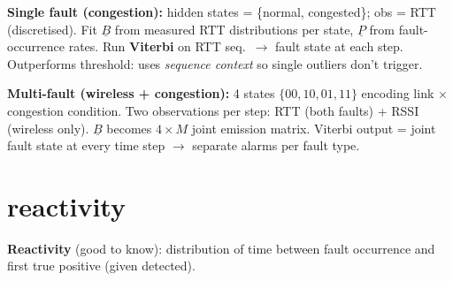 \documentclass[10pt,a4paper]{article}
\begin{document}
\begin{minipage}[t]{0.48\textwidth}
\vspace{0pt}
\begin{keybox}
\footnotesize\textbf{Single fault (congestion):} hidden states = \{normal, congested\}; obs = RTT (discretised). Fit $\underline{B}$ from measured RTT distributions per state, $\underline{P}$ from fault-occurrence rates. Run \textbf{Viterbi} on RTT seq.\ $\to$ fault state at each step. Outperforms threshold: uses \emph{sequence context} so single outliers don't trigger.
\end{keybox}
\end{minipage}\hfill
\begin{minipage}[t]{0.48\textwidth}
\vspace{0pt}
\begin{defbox}
\footnotesize\textbf{Multi-fault (wireless + congestion):} 4 states $\{00,10,01,11\}$ encoding link $\times$ congestion condition. Two observations per step: RTT (both faults) + RSSI (wireless only). $\underline{B}$ becomes $4{\times}M$ joint emission matrix. Viterbi output = joint fault state at every time step $\to$ separate alarms per fault type.
\end{defbox}
\end{minipage}
\section{reactivity}
\begin{notebox}
\small\textbf{Reactivity} (good to know): distribution of time between fault occurrence and first true positive (given detected).
\begin{center}
\end{center}
\end{notebox}
\end{document}
